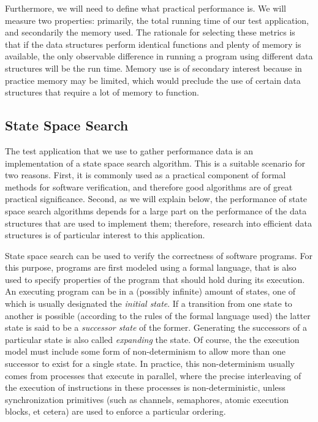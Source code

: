 \documentclass{acm_proc_article-sp}
\begin{document}
Furthermore, we will need to define what practical performance is. We will measure two properties: primarily, the total running time of our test application, and secondarily the memory used. The rationale for selecting these metrics is that if the data structures perform identical functions and plenty of memory is available, the only observable difference in running a program using different data structures will be the run time. Memory use is of secondary interest because in practice memory may be limited, which would preclude the use of certain data structures that require a lot of memory to function.

\subsection{State Space Search}
The test application that we use to gather performance data is an implementation
of a state space search algorithm.
This is a suitable scenario for two reasons.
First, it is commonly used as a practical
component of formal methods for software verification, and therefore good
algorithms are of great practical significance. Second, as we will explain
below, the performance of state space search algorithms depends for a large
part on the performance of the data structures that are used to implement
them; therefore, research into efficient data structures is of particular
interest to this application.

State space search can be used to verify the correctness of software programs. For this purpose, programs are first modeled using a formal language, that is also used to specify properties of the program that should hold during its
execution. An executing program can be in a (possibly infinite) amount of states,
one of which is usually designated the \emph{initial state}. If a transition
from one state to another is possible (according to the rules of the formal
language used) the latter state is said to be a \emph{successor state} of the
former.
Generating the successors of a particular state is also called
\emph{expanding} the state. Of course, the the execution model
must include some form of non-determinism to allow more than one successor to
exist for a single state.
In practice, this non-determinism usually comes from processes that execute in
parallel, where the precise interleaving of the execution of
instructions in these processes is non-deterministic, unless synchronization
primitives (such as channels, semaphores, atomic execution blocks, et cetera)
are used to enforce a particular ordering.
\end{document}
